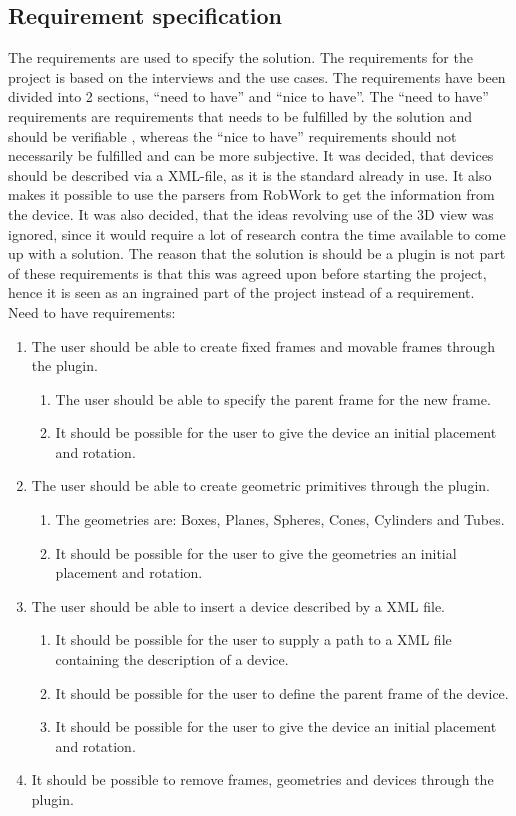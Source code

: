 \subsection{Requirement specification}
The requirements are used to specify the solution. The requirements for the project is based on the interviews and the use cases. The requirements have been divided into 2 sections, “need to have” and “nice to have”. The “need to have” requirements are requirements that needs to be fulfilled by the solution and should be verifiable , whereas the “nice to have” requirements should not necessarily be fulfilled and can be more subjective. It was decided, that devices should be described via a XML-file, as it is the standard already in use. It also makes it possible to use the parsers from RobWork to get the information from the device. It was also decided, that the ideas revolving use of the 3D view was ignored, since it would require a lot of research contra the time available to come up with a solution. The reason that the solution is should be a plugin is not part of these requirements is that this was agreed upon before starting the project, hence it is seen as an ingrained part of the project instead of a requirement.\\

Need to have requirements:
\begin{enumerate}
	\item The user should be able to create fixed frames and movable frames through the plugin.
	\begin{enumerate}
		\item The user should be able to specify the parent frame for the new
		 frame.
		 \item It should be possible for the user to give the device an initial placement and rotation.
	\end{enumerate}
	\item The user should be able to create geometric primitives through the plugin.
	\begin{enumerate}
		\item The geometries are: Boxes, Planes, Spheres, Cones, Cylinders and Tubes.
		\item It should be possible for the user to give the geometries an initial placement and rotation.
	\end{enumerate}
	\item The user should be able to insert a device described by a XML file.
	\begin{enumerate}
		\item It should be possible for the user to supply a path to a XML file containing the description of a device.
		\item It should be possible for the user to define the parent frame of the device.
		\item It should be possible for the user to give the device an initial placement and rotation.
	\end{enumerate}
	\item It should be possible to remove frames, geometries and devices through the plugin.
\end{enumerate}

